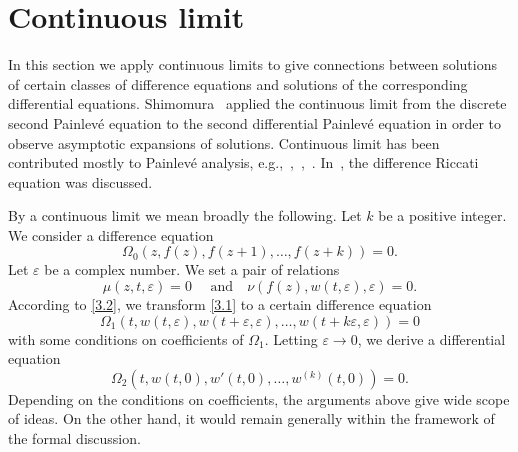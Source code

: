 \documentclass{amsart}
\begin{document}
\section{Continuous limit}\label{limitSec}%
In this section we apply continuous limits to give connections between solutions of certain classes of difference equations and solutions of the corresponding differential equations.
Shimomura~\cite{shimomura:12} applied the continuous limit from the discrete second Painlev\'e equation to
the second differential Painlev\'e equation in order to
observe asymptotic expansions of solutions.
Continuous limit has  been contributed mostly to Painlev\'e analysis, e.g.,~\cite[\S 50]{gromakls:02},~\cite{quispelcs:92},~\cite{ramanigh:91}. In~\cite{ishizaki:17}, the difference Riccati equation was discussed.

By a continuous limit we mean broadly the following. Let $k$ be a positive integer. We consider a difference equation
\begin{equation}
\Omega_0(z,f(z), f(z+1), \dots, f(z+k))=0.\label{3.1}
\end{equation}
Let $\varepsilon$ be a complex number. We set a pair of relations
\begin{equation}
\mu(z,t,\varepsilon)=0 \quad\text{ and}\quad\nu(f(z), w(t,\varepsilon), \varepsilon)=0.\label{3.2}
\end{equation}
According to \eqref{3.2}, we transform \eqref{3.1} to a certain difference equation
\begin{equation}
\Omega_1(t,w(t,\varepsilon), w(t+\varepsilon,\varepsilon), \dots, w(t+k\varepsilon,\varepsilon))=0\label{3.3}
\end{equation}
with some conditions on coefficients of $\Omega_1$.
Letting $\varepsilon\to0$, we derive a differential equation
\begin{equation}
\Omega_2(t,w(t,0),w'(t,0),\dots, w^{(k)}(t,0))=0.\label{3.4}
\end{equation}
Depending on the conditions on coefficients, the arguments above give wide scope of ideas.
On the other hand, it would remain generally within the framework of the formal discussion.
\end{document}
